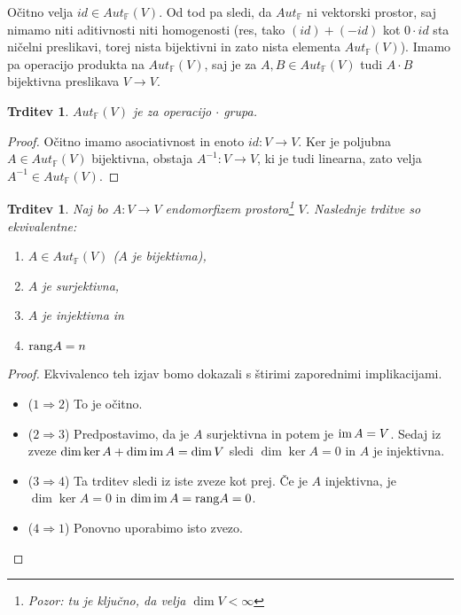 \documentclass[10pt, a4paper]{article}
\newtheorem{trditev}[izr]{Trditev}
\newenvironment{noticeC}{%
  \tcolorbox[%
  notitle,
  empty,
  enhanced,  %
  breakable,
  coltext=black, 
  fontupper=\rmfamily,
  parbox=false,
  noparskip,
  sharp corners,
  boxrule=-1pt,  %
  frame hidden,
  left=7pt,  %
  right=7pt,
  top=5pt,
  bottom=5pt,
  before skip=2.5ex plus 2pt,
  after skip=2.5ex plus 2pt,
  overlay unbroken and last={%
  },
  ]}
{\endtcolorbox}
\newenvironment{dokaz}%
  {\begin{noticeC}\begin{proof}}%
  {\end{proof}\end{noticeC}}
\newcommand{\F}{\mathbb {F}}
\newcommand{\im}{\textup{\text{im}}\,}
\newcommand{\rang}{\textup{\text{rang}}}
\begin{document}
Očitno velja $id \in Aut_\F (V)$. 
Od tod pa sledi, da $Aut_\F$ ni vektorski prostor, saj nimamo niti aditivnosti niti homogenosti (res, tako $(id) + (-id)$ kot $0 \cdot id$ sta ničelni preslikavi, torej nista bijektivni in zato nista elementa $Aut_\F(V)$).
Imamo pa operacijo produkta na $Aut_\F (V)$, saj je za $A, B \in Aut_\F (V)$ tudi $A \cdot B$ bijektivna preslikava $V \rightarrow V$.

\begin{trditev}
    $Aut_\F(V)$ je za operacijo $\cdot$ grupa.
\end{trditev}

\begin{dokaz}
    Očitno imamo asociativnost in enoto $id: V \rightarrow V$.
    Ker je poljubna $A \in Aut_\F (V)$ bijektivna, obstaja $A^{-1} : V \rightarrow V$, ki je tudi linearna, zato velja $A^{-1} \in Aut_\F (V)$.
\end{dokaz}

\begin{trditev}
    Naj bo $A: V \rightarrow V$ endomorfizem prostora\footnote{Pozor: tu je ključno, da velja $\dim V < \infty$} $V$. Naslednje trditve so ekvivalentne:
    \begin{enumerate}
        \item $A \in Aut_\F (V)$ ($A$ je bijektivna),
        \item $A$ je surjektivna,
        \item $A$ je injektivna in
        \item $\rang A = n$
    \end{enumerate}
\end{trditev}

\begin{dokaz}
    Ekvivalenco teh izjav bomo dokazali s štirimi zaporednimi implikacijami.
    \begin{itemize}
        \item ($1 \Rightarrow 2$) To je očitno.
        \item ($2 \Rightarrow 3$) Predpostavimo, da je $A$ surjektivna in potem je $\im A = V$. 
        Sedaj iz zveze $\dim \ker A + \dim \im A = \dim V$ sledi $\dim \ker A = 0$ in $A$ je injektivna.
        \item ($3 \Rightarrow 4$) Ta trditev sledi iz iste zveze kot prej. Če je $A$ injektivna, je $\dim \ker A = 0$ in $\dim \im A = \rang A= 0$.
        \item ($4 \Rightarrow 1$) Ponovno uporabimo isto zvezo. \qedhere
    \end{itemize}
\end{dokaz}
\end{document}
